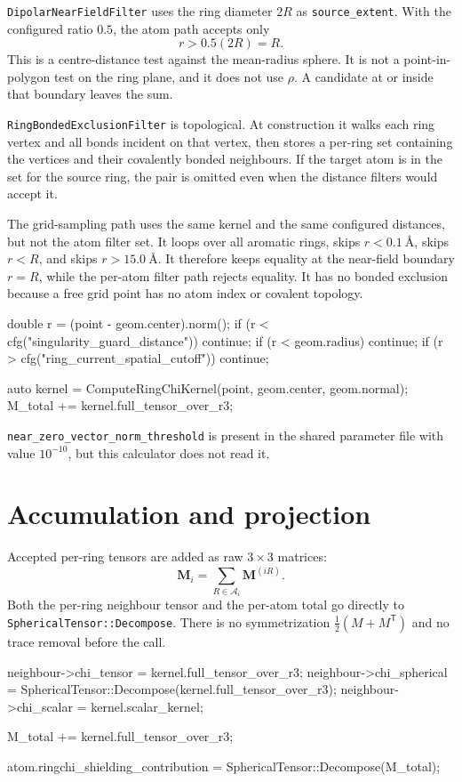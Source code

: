 \documentclass[11pt]{article}
\newcommand{\code}[1]{\texttt{#1}}
\begin{document}
\code{DipolarNearFieldFilter} uses the ring diameter \(2R\) as
\code{source\_extent}. With the configured ratio \(0.5\), the atom path
accepts only
\[
  r > 0.5(2R)=R .
\]
This is a centre-distance test against the mean-radius sphere. It is not a
point-in-polygon test on the ring plane, and it does not use \(\rho\). A
candidate at or inside that boundary leaves the sum.

\code{RingBondedExclusionFilter} is topological. At construction it walks each
ring vertex and all bonds incident on that vertex, then stores a per-ring set
containing the vertices and their covalently bonded neighbours. If the target
atom is in the set for the source ring, the pair is omitted even when the
distance filters would accept it.

The grid-sampling path uses the same kernel and the same configured distances,
but not the atom filter set. It loops over all aromatic rings, skips
\(r<\SI{0.1}{\angstrom}\), skips \(r<R\), and skips
\(r>\SI{15.0}{\angstrom}\). It therefore keeps equality at the near-field
boundary \(r=R\), while the per-atom filter path rejects equality. It has no
bonded exclusion because a free grid point has no atom index or covalent
topology.

\begin{codebox}
double r = (point - geom.center).norm();
if (r < cfg("singularity_guard_distance")) continue;
if (r < geom.radius) continue;
if (r > cfg("ring_current_spatial_cutoff")) continue;

auto kernel = ComputeRingChiKernel(point, geom.center, geom.normal);
M_total += kernel.full_tensor_over_r3;
\end{codebox}

\code{near\_zero\_vector\_norm\_threshold} is present in the shared parameter
file with value \(10^{-10}\), but this calculator does not read it.

\section{Accumulation and projection}

Accepted per-ring tensors are added as raw \(3\times3\) matrices:
\[
  \bm M_i=\sum_{R\in\mathcal A_i}\bm M^{(iR)} .
\]
Both the per-ring neighbour tensor and the per-atom total go directly to
\code{SphericalTensor::Decompose}. There is no symmetrization
\(\frac12(M+M^{\mathsf T})\) and no trace removal before the call.

\begin{codebox}
neighbour->chi_tensor = kernel.full_tensor_over_r3;
neighbour->chi_spherical =
    SphericalTensor::Decompose(kernel.full_tensor_over_r3);
neighbour->chi_scalar = kernel.scalar_kernel;

M_total += kernel.full_tensor_over_r3;

atom.ringchi_shielding_contribution =
    SphericalTensor::Decompose(M_total);
\end{codebox}
\end{document}

